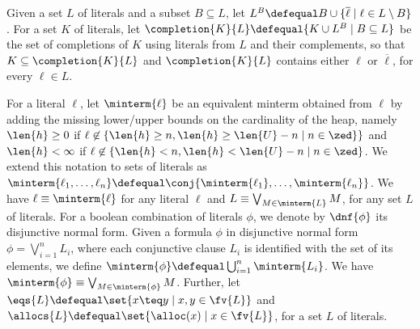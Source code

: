 
Given a set $L$ of literals and a subset $B \subseteq L$, let $L^{B}
\defequal B \cup \{\overline\ell \mid \ell \in L \setminus B\}$. For a
set $K$ of literals, let $\completion{K}{L} \defequal \{K \cup L^{B}
\mid B \subseteq L \}$ be the set of completions of $K$ using literals
from $L$ and their complements, so that $K \subseteq
\completion{K}{L}$ and $\completion{K}{L}$ contains either $\ell$ or
$\overline\ell$, for every $\ell \in L$.


For a literal $\ell$, let $\minterm{\ell}$ be an equivalent minterm
obtained from $\ell$ by adding the missing lower/upper bounds on the
cardinality of the heap, namely $\len{h}\geq0$ if $\ell \not\in
\{\len{h} \geq n, \len{h} \geq \len{U}-n \mid n \in \zed\}\}$ and
$\len{h} < \infty$ if $\ell \not\in \{\len{h} < n, \len{h} < \len{U}-n
\mid n \in \zed\}$. We extend this notation to sets of literals as
$\minterm{\ell_1,\dots,\ell_n} \defequal
\conj{\minterm{\ell_1},\dots,\minterm{\ell_n}}$. We have $\ell \equiv
\minterm{\ell}$ for any literal $\ell$ and $L \equiv
\bigvee_{M\in\minterm{L}} M$, for any set $L$ of literals.  For a
boolean combination of literals $\phi$, we denote by $\dnf{\phi}$ its
disjunctive normal form. Given a formula $\phi$ in disjunctive normal
form $\phi = \bigvee_{i=1}^n L_i$, where each conjunctive clause
$L_i$ is identified with the set of its elements, we define
$\minterm{\phi} \defequal \bigcup_{i=1}^n \minterm{L_i}$. We have
$\minterm{\phi} \equiv \bigvee_{M\in \minterm{\phi}} M$. Further, let
$\eqs{L} \defequal \set{x \teq y \mid x,y \in \fv{L}}$ and $\allocs{L}
\defequal \set{\alloc(x) \mid x \in \fv{L}}$, for a set $L$ of
literals.

